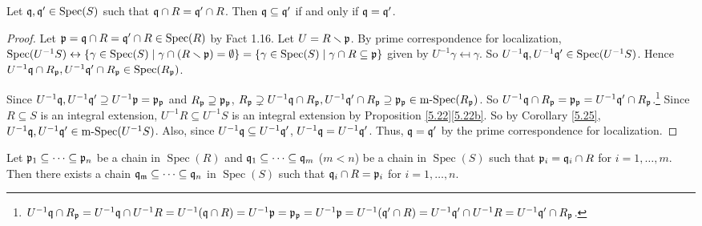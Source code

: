 \begin{proposition}\label{5.27}
    Let $\mathfrak{q},\mathfrak{q}' \in \operatorname{Spec}(S)$ such that $\mathfrak{q} \cap R = \mathfrak{q}' \cap R$. Then $\mathfrak{q} \subseteq \mathfrak{q}'$ if and only if $\mathfrak{q} = \mathfrak{q}'$.
\end{proposition}

\begin{proof}
    Let $\mathfrak{p} = \mathfrak{q} \cap R = \mathfrak{q}' \cap R \in \operatorname{Spec}(R)$ by Fact 1.16. Let $U = R \smallsetminus \mathfrak{p}$. By prime correspondence for localization, $\operatorname{Spec}(U^{-1}S) \leftrightarrow \{\gamma \in \operatorname{Spec}(S) \mid \gamma \cap (R\smallsetminus \mathfrak{p}) = \emptyset\} = \{\gamma \in \operatorname{Spec}(S) \mid \gamma \cap R \subseteq \mathfrak{p}\}$ given by $U^{-1}\gamma \mapsfrom \gamma$. So $U^{-1}\mathfrak{q},U^{-1}\mathfrak{q}' \in \operatorname{Spec}(U^{-1}S)$. Hence $U^{-1}\mathfrak{q} \cap R_{\mathfrak{p}}, U^{-1}\mathfrak{q}' \cap R_{\mathfrak{p}} \in \operatorname{Spec}(R_{\mathfrak{p}})$.
    \begin{center}
    \end{center}
    Since $U^{-1}\mathfrak{q}, U^{-1}\mathfrak{q}' \supseteq U^{-1}\mathfrak{p} = \mathfrak{p}_{\mathfrak{p}}$ and $R_{\mathfrak{p}} \supseteq \mathfrak{p}_{\mathfrak{p}}$, $R_{\mathfrak{p}} \supsetneq U^{-1}\mathfrak{q} \cap R_{\mathfrak{p}}, U^{-1}\mathfrak{q}' \cap R_{\mathfrak{p}} \supseteq \mathfrak{p}_{\mathfrak{p}} \in \operatorname{m-Spec}(R_{\mathfrak{p}})$. So $U^{-1}\mathfrak{q} \cap R_{\mathfrak{p}} = \mathfrak{p}_{\mathfrak{p}} = U^{-1}\mathfrak{q}' \cap R_{\mathfrak{p}}$.\footnote[2]{$U^{-1}\mathfrak{q} \cap R_{\mathfrak{p}} = U^{-1}\mathfrak{q} \cap U^{-1}R = U^{-1}(\mathfrak{q} \cap R) = U^{-1}\mathfrak{p} = \mathfrak{p}_{\mathfrak{p}} = U^{-1}\mathfrak{p} = U^{-1}(\mathfrak{q}' \cap R) = U^{-1}\mathfrak{q}' \cap U^{-1}R = U^{-1}\mathfrak{q}' \cap R_{\mathfrak{p}}$.} Since $R \subseteq S$ is an integral extension, $U^{-1}R \subseteq U^{-1}S$ is an integral extension by Proposition \ref{5.22}\ref{5.22b}. So by Corollary \ref{5.25}, $U^{-1}\mathfrak{q},U^{-1}\mathfrak{q}' \in \operatorname{m-Spec}(U^{-1}S)$. Also, since $U^{-1}\mathfrak{q} \subseteq U^{-1}\mathfrak{q}'$, $U^{-1}\mathfrak{q} = U^{-1}\mathfrak{q}'$. Thus, $\mathfrak{q} = \mathfrak{q}'$ by the prime correspondence for localization.
\end{proof}

\begin{theorem} \label{5.28}
    Let $\mathfrak{p}_1 \subseteq \cdots \subseteq \mathfrak{p}_n$ be a chain in $\operatorname{Spec}(R)$ and $\mathfrak{q}_1 \subseteq \cdots \subseteq \mathfrak{q}_m$ ($m < n$) be a chain in $\operatorname{Spec}(S)$ such that $\mathfrak{p}_i = \mathfrak{q}_i \cap R$ for $i = 1,\ldots,m$. Then there exists a chain $\mathfrak{q}_{\mathfrak{m}} \subseteq \cdots \subseteq \mathfrak{q}_n$ in $\operatorname{Spec}(S)$ such that $\mathfrak{q}_i \cap R = \mathfrak{p}_i$ for $i = 1,\ldots,n$.
\end{theorem}


